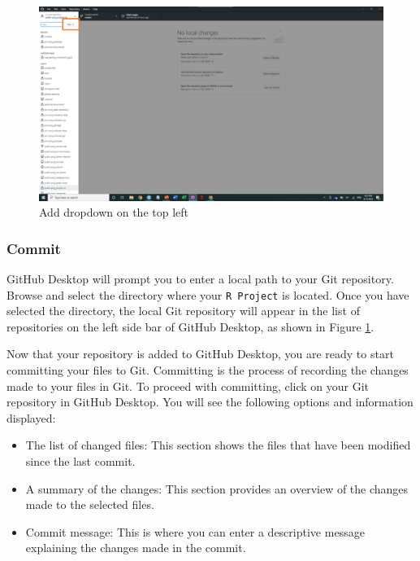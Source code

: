 \documentclass[
]{article}
\providecommand{\tightlist}{%
  \setlength{\itemsep}{0pt}\setlength{\parskip}{0pt}}
\begin{document}
\begin{figure}

{\centering \includegraphics[width=61.11in]{image/git_image03} 

}

\caption{Add dropdown on the top left}\label{fig:gitdesktop2}
\end{figure}

\hypertarget{commit}{%
\subsubsection{Commit}\label{commit}}

GitHub Desktop will prompt you to enter a local path to your Git repository. Browse and select the directory where your \texttt{R\ Project} is located. Once you have selected the directory, the local Git repository will appear in the list of repositories on the left side bar of GitHub Desktop, as shown in Figure \ref{fig:gitdesktop2}.

Now that your repository is added to GitHub Desktop, you are ready to start committing your files to Git. Committing is the process of recording the changes made to your files in Git. To proceed with committing, click on your Git repository in GitHub Desktop. You will see the following options and information displayed:

\begin{itemize}
\tightlist
\item
  The list of changed files: This section shows the files that have been modified since the last commit.
\item
  A summary of the changes: This section provides an overview of the changes made to the selected files.
\item
  Commit message: This is where you can enter a descriptive message explaining the changes made in the commit.
\end{itemize}
\end{document}
